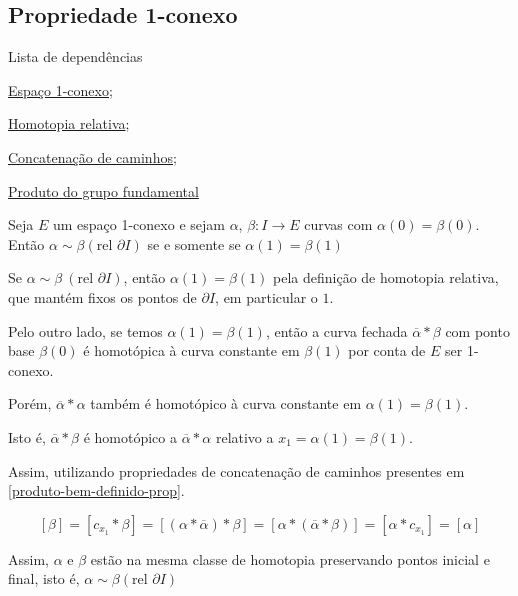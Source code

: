 \subsection{Propriedade 1-conexo} %
\label{1-conexo-prop}
\begin{titlemize}{Lista de dependências}
	\item \hyperref[espaço-1-conexo-def]{Espaço 1-conexo};\\ %
	\item \hyperref[homotopia-relativa-def]{Homotopia relativa};\\
        \item \hyperref[Produto-concatenacao-def]{Concatenação de caminhos};\\
        \item  \hyperref[produto-bem-definido-prop]{Produto do grupo fundamental}
\end{titlemize}




\begin{prop}[Nome da Afirmação]%
	Seja $E$ um espaço 1-conexo e sejam $\alpha$, $\beta: I\rightarrow E$ curvas com $\alpha(0)=\beta(0)$. Então $\alpha \sim \beta (\text{rel }\partial I)$ se e somente se $\alpha(1)=\beta(1)$\\
\end{prop}
\begin{dem}
    Se $\alpha \sim \beta ~(\text{rel }\partial I)$, então $\alpha(1)=\beta(1)$ pela definição de homotopia relativa, que mantém fixos os pontos de $\partial I$, em particular o $1$.

    Pelo outro lado, se temos $\alpha(1)=\beta(1)$, então a curva fechada $\overline{\alpha}* \beta$ com ponto base $\beta(0)$ é homotópica à curva constante em $\beta(1)$ por conta de $E$ ser 1-conexo.
    
    Porém, $\overline{\alpha}*\alpha$ também é homotópico à curva constante em $\alpha(1)=\beta(1)$. 
    
    Isto é, $\overline{\alpha}* \beta$ é homotópico a $\overline{\alpha}*\alpha$ relativo a $x_1=\alpha(1)=\beta(1)$.

    Assim, utilizando propriedades de concatenação de caminhos presentes em \ref{produto-bem-definido-prop}.

   $$[\beta]=[c_{x_1}*\beta]=[(\alpha * \overline{\alpha}) *\beta]=[\alpha*(\overline{\alpha}*\beta)]=[\alpha * c_{x_1}]=[\alpha]$$

   Assim, $\alpha$ e $\beta$ estão na mesma classe de homotopia preservando pontos inicial e final, isto é, $\alpha \sim \beta (\text{rel }\partial I)$
\end{dem}

